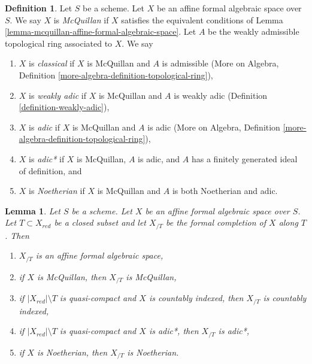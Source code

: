 \documentclass{stacks-project}
\theoremstyle{plain}
\newtheorem{lemma}[subsection]{Lemma}
\theoremstyle{definition}
\newtheorem{definition}[subsection]{Definition}
\theoremstyle{remark}
\numberwithin{equation}{subsection}
\begin{document}
\begin{definition}
\label{definition-types-affine-formal-algebraic-space}
Let $S$ be a scheme. Let $X$ be an affine formal algebraic space over $S$.
We say $X$ is {\it McQuillan} if $X$ satisfies the equivalent conditions
of Lemma \ref{lemma-mcquillan-affine-formal-algebraic-space}. Let $A$
be the weakly admissible topological ring associated to $X$. We say
\begin{enumerate}
\item $X$ is {\it classical} if $X$ is McQuillan and $A$ is admissible
(More on Algebra, Definition \ref{more-algebra-definition-topological-ring}),
\item $X$ is {\it weakly adic} if $X$ is McQuillan and $A$ is weakly adic
(Definition \ref{definition-weakly-adic}),
\item $X$ is {\it adic} if $X$ is McQuillan and $A$ is adic
(More on Algebra, Definition \ref{more-algebra-definition-topological-ring}),
\item $X$ is {\it adic*} if $X$ is McQuillan, $A$ is adic, and $A$
has a finitely generated ideal of definition, and
\item $X$ is {\it Noetherian} if $X$ is McQuillan and $A$ is
both Noetherian and adic.
\end{enumerate}
\end{definition}

\begin{lemma}
\label{lemma-recompletion-affine-types}
Let $S$ be a scheme. Let $X$ be an affine formal algebraic space over $S$.
Let $T \subset X_{red}$ be a closed subset and let $X_{/T}$
be the formal completion of $X$ along $T$. Then
\begin{enumerate}
\item $X_{/T}$ is an affine formal algebraic space,
\item if $X$ is McQuillan, then $X_{/T}$ is McQuillan,
\item if $|X_{red}| \setminus T$ is quasi-compact and $X$
is countably indexed, then $X_{/T}$ is countably indexed,
\item if $|X_{red}| \setminus T$ is quasi-compact and $X$
is adic*, then $X_{/T}$ is adic*,
\item if $X$ is Noetherian, then $X_{/T}$ is Noetherian.
\end{enumerate}
\end{lemma}
\end{document}
